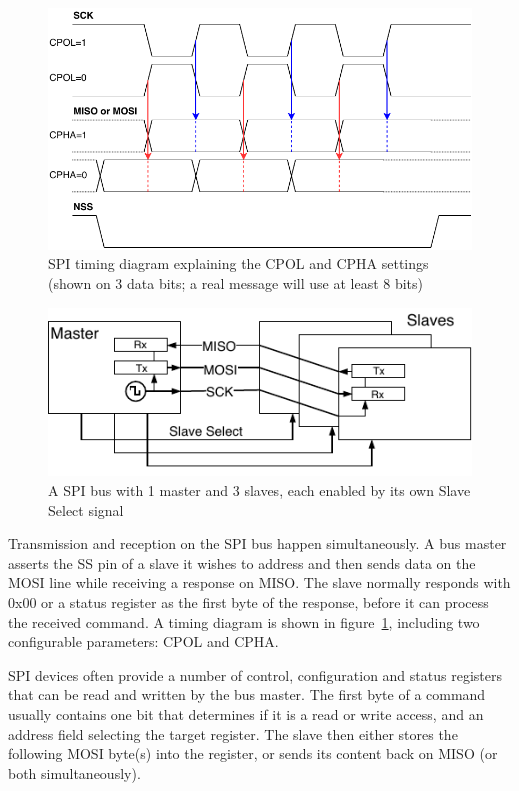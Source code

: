 \begin{figure}[h]
	\centering
	\includegraphics[scale=.9] {img/spi-timing.pdf}
	\caption[SPI timing diagram]{\label{fig:spi-timing}SPI timing diagram explaining the CPOL and CPHA settings (shown on 3 data bits; a real message will use at least 8 bits)}
\end{figure}

\begin{figure}[h]
\centering
\includegraphics[scale=1.1] {img/spi-multislave-redraw.pdf}
\caption[SPI master with multiple slaves]{\label{fig:spi-multislave}A SPI bus with 1 master and 3 slaves, each enabled by its own Slave Select signal}
\end{figure}

Transmission and reception on the \gls{SPI} bus happen simultaneously. A bus master asserts the \gls{SS} pin of a slave it wishes to address and then sends data on the \gls{MOSI} line while receiving a response on \gls{MISO}. The slave normally responds with 0x00 or a status register as the first byte of the response, before it can process the received command. A timing diagram is shown in figure~\ref{fig:spi-timing}, including two configurable parameters: \gls{CPOL} and \gls{CPHA}.

\gls{SPI} devices often provide a number of control, configuration and status registers that can be read and written by the bus master. The first byte of a command usually contains one bit that determines if it is a read or write access, and an address field selecting the target register. The slave then either stores the following \gls{MOSI} byte(s) into the register, or sends its content back on \gls{MISO} (or both simultaneously).

